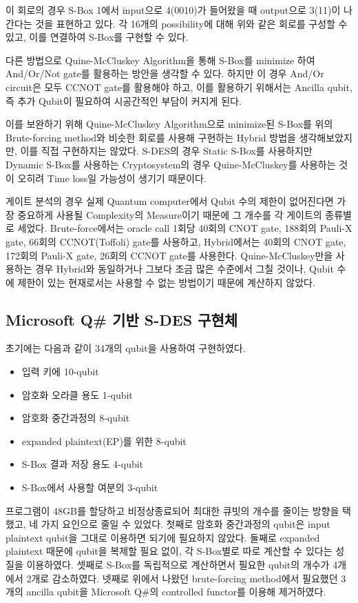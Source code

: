 \documentclass{article}
\theoremstyle{break}
\begin{document}
	이 회로의 경우 S-Box 1에서 input으로 4(0010)가 들어왔을 때 output으로 3(11)이 나간다는 것을 표현하고 있다. 각 16개의 possibility에 대해 위와 같은 회로를 구성할 수 있고, 이를 연결하여 S-Box를 구현할 수 있다.
	
	다른 방법으로 Quine-McCluskey Algorithm을 통해 S-Box를 minimize 하여 And/Or/Not gate를 활용하는 방안을 생각할 수 있다. 하지만 이 경우 And/Or circuit은 모두 CCNOT gate를 활용해야 하고, 이를 활용하기 위해서는 Ancilla qubit, 즉 추가 Qubit이 필요하여 시공간적인 부담이 커지게 된다.
	
	이를 보완하기 위해 Quine-McCluskey Algorithm으로 minimize된 S-Box를 위의 Brute-forcing method와 비슷한 회로를 사용해 구현하는 Hybrid 방법을 생각해보았지만, 이를 직접 구현하지는 않았다. S-DES의 경우 Static S-Box를 사용하지만 Dynamic S-Box를 사용하는 Cryptosystem의 경우 Quine-McCluskey를 사용하는 것이 오히려 Time loss일 가능성이 생기기 때문이다.
	
	게이트 분석의 경우 실제 Quantum computer에서 Qubit 수의 제한이 없어진다면 가장 중요하게 사용될 Complexity의 Measure이기 때문에 그 개수를 각 게이트의 종류별로 세었다. Brute-force에서는 oracle call 1회당 40회의 CNOT gate, 188회의 Pauli-X gate, 66회의 CCNOT(Toffoli) gate를 사용하고, Hybrid에서는 40회의 CNOT gate, 172회의 Pauli-X gate, 26회의 CCNOT gate를 사용한다. Quine-McCluskey만을 사용하는 경우 Hybrid와 동일하거나 그보다 조금 많은 수준에서 그칠 것이나, Qubit 수에 제한이 있는 현재로서는 사용할 수 없는 방법이기 때문에 계산하지 않았다.
	
    \subsection{Microsoft Q\# 기반 S-DES 구현체}
    초기에는 다음과 같이 34개의 qubit을 사용하여 구현하였다.
    \begin{itemize}
        \item 입력 키에 10-qubit
        \item 암호화 오라클 용도 1-qubit
        \item 암호화 중간과정의 8-qubit
        \item expanded plaintext(EP)를 위한 8-qubit
        \item S-Box 결과 저장 용도 4-qubit
        \item S-Box에서 사용할 여분의 3-qubit
    \end{itemize}
    프로그램이 48GB를 할당하고 비정상종료되어 최대한 큐빗의 개수를 줄이는 방향을 택했고, 네 가지 요인으로 줄일 수 있었다. 첫째로 암호화 중간과정의 qubit은 input plaintext qubit을 그대로 이용하면 되기에 필요하지 않았다. 둘째로 expanded plaintext 때문에 qubit을 복제할 필요 없이, 각 S-Box별로 따로 계산할 수 있다는 성질을 이용하였다. 셋째로 S-Box를 독립적으로 계산하면서 필요한 qubit의 개수가 4개에서 2개로 감소하였다. 넷째로 위에서 나왔던 brute-forcing method에서 필요했던 3개의 ancilla qubit을 Microsoft Q\#의 controlled functor를 이용해 제거하였다.
    
\end{document}

